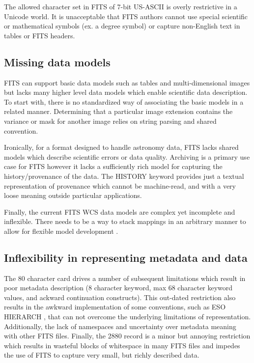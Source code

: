 \documentclass[11pt,twoside]{article}
\begin{document}
The allowed character set in FITS of 7-bit US-ASCII is overly restrictive in a
Unicode world. It is unacceptable that FITS authors cannot use special 
scientific or mathematical symbols (ex. a degree symbol) or capture 
non-English text in tables or FITS headers.

\subsection{Missing data models}

FITS can support basic data models such as tables and multi-dimensional 
images but lacks many higher level data models which enable scientific
data description. To start with, there is no standardized way of associating
the basic models in a related manner. Determining that a particular image 
extension contains the variance or mask for another image relies on string 
parsing and shared convention. 

Ironically, for a format designed to handle astronomy data, FITS lacks shared
models which describe scientific errors or data quality. Archiving is
a primary use case for FITS however it lacks a sufficiently rich model 
for capturing the history/provenance of the data.
The HISTORY keyword provides just a textual representation of
provenance which cannot be machine-read, and with a very loose 
meaning outside particular applications.

Finally, the current FITS WCS data models are complex yet incomplete and
inflexible. There needs to be a way to stack mappings in an arbitrary
manner to allow for flexible model development \citep[see
e.g.][]{1998ASPC..145...41W,2012ASPC..461..825B,O35_adassxxii}.


\subsection{Inflexibility in representing metadata and data}

The 80 character card drives a number of subsequent limitations which
result in poor metadata description (8 character keyword, max 68 character keyword values, and ackward continuation constructs). 
This out-dated restriction also results in the awkward implementation 
of some conventions, such as ESO HIERARCH \citep{2009Wic}, that can not 
overcome the underlying limitations of representation. Additionally, the lack of 
namespaces and uncertainty over metadata meaning with other FITS files.
Finally, the 2880 record is a minor but annoying restriction which results
in wasteful blocks of whitespace in many FITS files and impedes the use
of FITS to capture very small, but richly described data.
\end{document}
